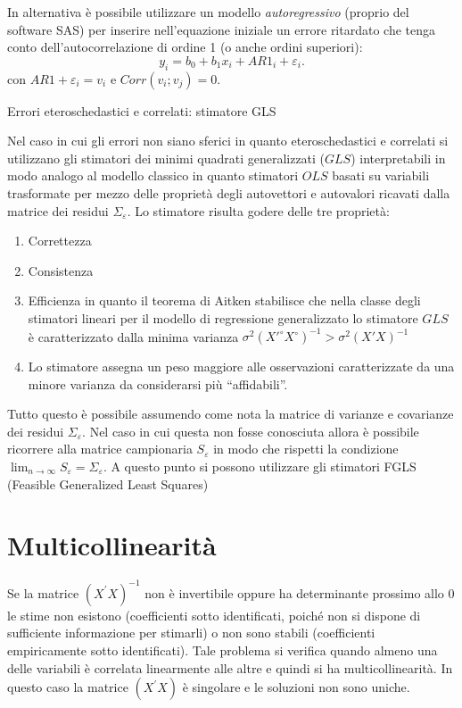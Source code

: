 \documentclass[a4page, 11pt]{article} %
\begin{document}
In alternativa è possibile utilizzare un modello \textit{autoregressivo} (proprio del software SAS) per inserire nell’equazione iniziale un errore ritardato che tenga conto dell’autocorrelazione di ordine 1 (o anche ordini superiori): 
\begin{equation*}
y_i=b_0 +b_1 x_i +AR1_i  + \varepsilon_i. 
\end{equation*}
con $AR1 + \varepsilon_i = v_i$ e $Corr(v_i;v_j) = 0$.
\newline
\begin{itshape}
Errori eteroschedastici e correlati: stimatore GLS
\end{itshape}

Nel caso in cui gli errori non siano sferici in quanto eteroschedastici e correlati si utilizzano gli stimatori dei minimi quadrati generalizzati ($GLS$) interpretabili in modo analogo al modello classico in quanto stimatori $OLS$ basati su variabili trasformate per mezzo delle proprietà degli autovettori e autovalori ricavati dalla matrice dei residui $\Sigma_\varepsilon$. Lo stimatore risulta godere delle tre proprietà:
\begin{enumerate}[noitemsep]
\item Correttezza
\item Consistenza
\item Efficienza in quanto il teorema di Aitken stabilisce che nella classe degli stimatori lineari per il modello di regressione generalizzato lo stimatore $GLS$ è caratterizzato dalla minima varianza $\sigma^2 (X'^{\circ}X^{\circ})^{-1} >\sigma^2 (X'X)^{-1}$
\item Lo stimatore assegna un peso maggiore alle osservazioni caratterizzate da una minore varianza da considerarsi più ``affidabili''.
\end{enumerate}
Tutto questo è possibile assumendo come nota la matrice di varianze e covarianze dei residui $\Sigma_\varepsilon$. Nel caso in cui questa non fosse conosciuta allora è possibile ricorrere alla matrice campionaria $S_\varepsilon$ in modo che rispetti la condizione $\lim_{n\to \infty}{S_\varepsilon = \Sigma_\varepsilon}$. A questo punto si possono utilizzare gli stimatori FGLS (Feasible Generalized Least Squares)

\section{Multicollinearità }

Se la matrice $(X^{\prime} X)^{-1}$ non è invertibile oppure ha determinante prossimo allo 0 le stime non esistono (coefficienti sotto identificati, poiché non si dispone di sufficiente informazione per stimarli) o non sono stabili (coefficienti empiricamente sotto identificati).
Tale problema si verifica quando almeno una delle variabili è correlata linearmente alle altre e quindi si ha multicollinearità. In questo caso la matrice $(X^{\prime} X)$ è singolare e le soluzioni non sono uniche. 
\end{document}
